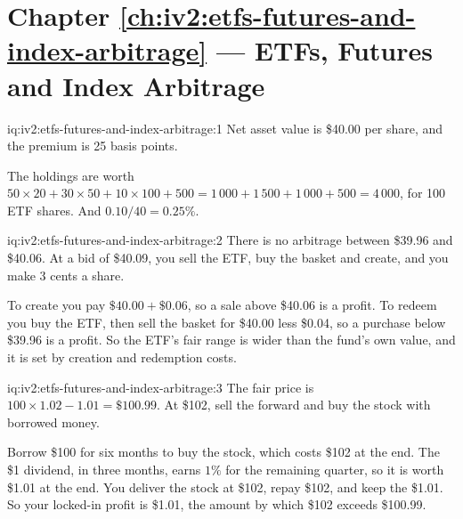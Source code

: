 \section*{Chapter \ref{ch:iv2:etfs-futures-and-index-arbitrage} --- ETFs, Futures and Index Arbitrage}

\begin{solution}{iq:iv2:etfs-futures-and-index-arbitrage:1}
Net asset value is \$40.00 per share, and the premium is 25 basis points.

The holdings are worth $50 \times 20 + 30 \times 50 + 10 \times 100 + 500 = 1\,000 + 1\,500 + 1\,000 + 500 = 4\,000$, for 100 ETF shares. And $0.10/40 = 0.25\%$.

\end{solution}

\begin{solution}{iq:iv2:etfs-futures-and-index-arbitrage:2}
There is no arbitrage between \$39.96 and \$40.06. At a bid of \$40.09, you sell the ETF, buy the basket and create, and you make 3 cents a share.

To create you pay $\$40.00 + \$0.06$, so a sale above \$40.06 is a profit. To redeem you buy the ETF, then sell the basket for \$40.00 less \$0.04, so a purchase below \$39.96 is a profit. So the ETF's fair range is wider than the fund's own value, and it is set by creation and redemption costs.

\end{solution}

\begin{solution}{iq:iv2:etfs-futures-and-index-arbitrage:3}
The fair price is $100 \times 1.02 - 1.01 = \$100.99$. At \$102, sell the forward and buy the stock with borrowed money.

Borrow \$100 for six months to buy the stock, which costs \$102 at the end. The \$1 dividend, in three months, earns $1\% $ for the remaining quarter, so it is worth \$1.01 at the end. You deliver the stock at \$102, repay \$102, and keep the \$1.01. So your locked-in profit is \$1.01, the amount by which \$102 exceeds \$100.99.

\end{solution}

